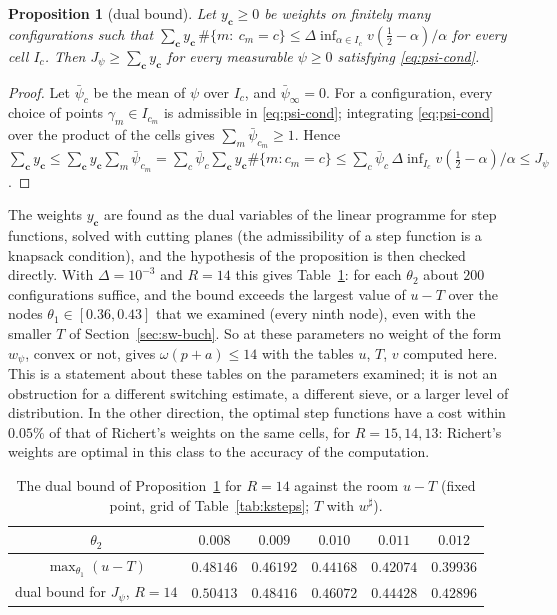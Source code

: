 \documentclass[11pt,a4paper]{amsart}
\newtheorem{proposition}[theorem]{Proposition}
\theoremstyle{remark}
\numberwithin{equation}{section}
\begin{document}
\begin{proposition}[dual bound]\label{prop:dual}
Let $y_{\mathbf c}\ge0$ be weights on finitely many configurations such that
$\sum_{\mathbf c}y_{\mathbf c}\,\#\{m:\ c_m=c\}\le\Delta\inf_{\alpha\in I_c}v(\frac12-\alpha)/\alpha$ for every cell $I_c$. Then
$J_\psi\ge\sum_{\mathbf c}y_{\mathbf c}$ for every measurable $\psi\ge0$ satisfying \eqref{eq:psi-cond}.
\end{proposition}
\begin{proof}
Let $\bar\psi_c$ be the mean of $\psi$ over $I_c$, and $\bar\psi_\infty=0$. For a configuration, every choice of
points $\gamma_m\in I_{c_m}$ is admissible in \eqref{eq:psi-cond}; integrating \eqref{eq:psi-cond} over the product
of the cells gives $\sum_m\bar\psi_{c_m}\ge1$. Hence
$\sum_{\mathbf c}y_{\mathbf c}\le\sum_{\mathbf c}y_{\mathbf c}\sum_m\bar\psi_{c_m}=\sum_c\bar\psi_c\sum_{\mathbf c}y_{\mathbf c}\#\{m:c_m=c\}
\le\sum_c\bar\psi_c\,\Delta\inf_{I_c}v(\frac12-\alpha)/\alpha\le J_\psi$.
\end{proof}
The weights $y_{\mathbf c}$ are found as the dual variables of the linear programme for step functions, solved
with cutting planes (the admissibility of a step function is a knapsack condition), and the hypothesis of the
proposition is then checked directly. With $\Delta=10^{-3}$ and $R=14$ this gives Table~\ref{tab:dual}: for each
$\theta_2$ about $200$ configurations suffice, and the bound exceeds the largest value of $u-T$ over the nodes
$\theta_1\in[0.36,0.43]$ that we examined (every ninth node), even with the smaller $T$ of Section~\ref{sec:sw-buch}. So at these parameters no weight of the
form $w_\psi$, convex or not, gives $\omega(p+a)\le14$ with the tables $u$, $T$, $v$ computed here. This is a
statement about these tables on the parameters examined; it is not an obstruction for a different switching
estimate, a different sieve, or a larger level of distribution. In the other
direction, the optimal step functions have a cost within $0.05\%$ of that of Richert's weights on the same
cells, for $R=15,14,13$: Richert's weights are optimal in this class to the accuracy of the computation.

\begin{table}[htbp]
\centering\small
\begin{tabular}{cccccc}
\toprule
$\theta_2$ & $0.008$ & $0.009$ & $0.010$ & $0.011$ & $0.012$\\
\midrule
$\max_{\theta_1}(u-T)$ & $0.48146$ & $0.46192$ & $0.44168$ & $0.42074$ & $0.39936$\\
dual bound for $J_\psi$, $R=14$ & $0.50413$ & $0.48416$ & $0.46072$ & $0.44428$ & $0.42896$\\
\bottomrule
\end{tabular}
\caption{The dual bound of Proposition~\ref{prop:dual} for $R=14$ against the room $u-T$ (fixed point, grid of
Table~\ref{tab:ksteps}; $T$ with $w^\sharp$).}
\label{tab:dual}
\end{table}
\end{document}
